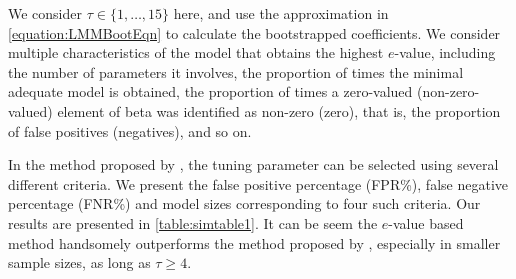 
We consider $\tau \in \{1, \ldots, 15 \}$ here, and use the approximation in \ref{equation:LMMBootEqn} to calculate the bootstrapped coefficients. We consider multiple characteristics of the model that obtains the highest $e$-value, including the number of parameters it involves, the proportion of times the minimal adequate model is 
obtained, the proportion of times a zero-valued (non-zero-valued) element of beta was identified as non-zero (zero), that is, the proportion of false positives (negatives), and so on.   

In the method proposed by \cite{PengLu12}, the tuning parameter can be selected using several different criteria. We present the false positive percentage (FPR\%), false negative percentage (FNR\%) and model sizes corresponding to 
four such criteria. Our results are presented in  \ref{table:simtable1}. It can be seem the $e$-value based method handsomely outperforms the  method proposed by \cite{PengLu12}, especially in smaller sample sizes, as long as $\tau \geq 4$. 

